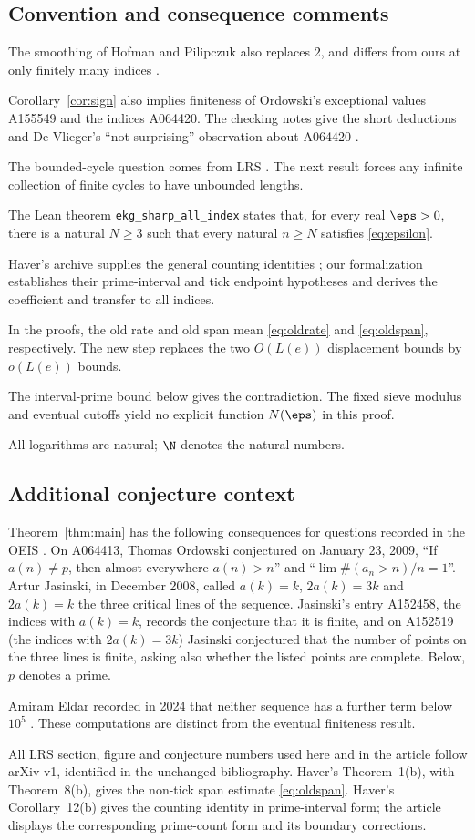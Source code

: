 \subsection*{Convention and consequence comments}
The smoothing of Hofman and Pilipczuk also replaces $2$, and differs
from ours at only finitely many indices \cite[Theorem~4.17]{hp}.

Corollary~\ref{cor:sign} also implies finiteness of Ordowski's exceptional
values A155549 and the indices A064420. The checking notes give the
short deductions and De Vlieger's ``not surprising'' observation
about A064420 \cite{devlieger}.

The bounded-cycle question comes from LRS \cite[Section~7]{lrs}.
The next result forces any infinite collection of finite cycles to
have unbounded lengths.

The Lean theorem \texttt{ekg\_sharp\_all\_index} states that, for every
real $\eps>0$, there is a natural $N\geq3$ such that every natural
$n\geq N$ satisfies \eqref{eq:epsilon}.

Haver's archive supplies the general counting identities
\cite[Corollary~12(b)]{haver}; our formalization establishes their
prime-interval and tick endpoint hypotheses and derives the coefficient
and transfer to all indices.

In the proofs, the old rate and old span mean \eqref{eq:oldrate} and
\eqref{eq:oldspan}, respectively. The new step replaces the two
$O(L(e))$ displacement bounds by $o(L(e))$ bounds.

The interval-prime
bound below gives the contradiction. The fixed sieve modulus and eventual
cutoffs yield no explicit function $N(\eps)$ in this proof.

All logarithms are natural; $\N$ denotes the natural numbers.

\subsection*{Additional conjecture context}
Theorem~\ref{thm:main} has the following consequences for questions
recorded in the OEIS \cite{oeis}. On A064413, Thomas Ordowski
conjectured on January 23, 2009, ``If $a(n)\neq p$, then almost
everywhere $a(n)>n$'' and ``$\lim\#(a_n>n)/n=1$''. Artur Jasinski, in
December 2008, called $a(k)=k$, $2a(k)=3k$ and $2a(k)=k$ the three
critical lines of the sequence. Jasinski's entry A152458, the indices with
$a(k)=k$, records the conjecture that it is finite, and on A152519 (the
indices with $2a(k)=3k$) Jasinski conjectured that the number of points on the
three lines is finite, asking also whether the listed points are
complete. Below, $p$ denotes a prime.

Amiram Eldar recorded in 2024 that neither sequence has a
further term below $10^5$ \cite{oeis}. These computations are distinct
from the eventual finiteness result.

All LRS section, figure and conjecture numbers used here and in the
article follow arXiv v1, identified in the unchanged bibliography.
Haver's Theorem~1(b), with Theorem~8(b), gives the non-tick span estimate
\eqref{eq:oldspan}. Haver's Corollary~12(b) gives the counting identity in
prime-interval form; the article displays the corresponding prime-count
form and its boundary corrections.
